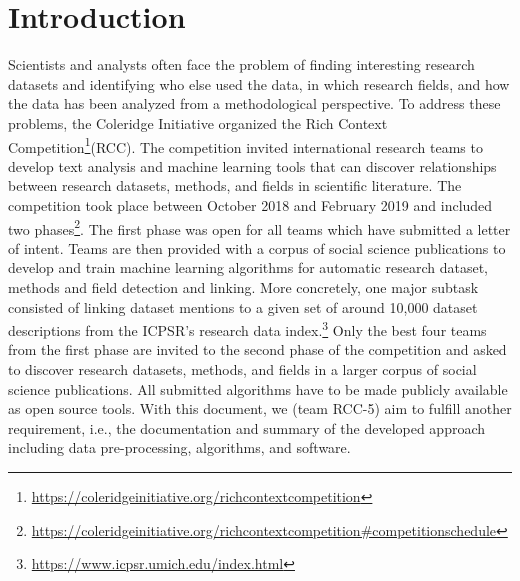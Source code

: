 \section{Introduction}
Scientists and analysts often face the problem of finding interesting research datasets and identifying who else used the data, in which research fields, and how the data has been analyzed from a methodological perspective.
To address these problems, the Coleridge Initiative organized the Rich Context Competition\footnote{\url{https://coleridgeinitiative.org/richcontextcompetition}}(RCC).
The competition invited international research teams to develop text analysis and machine learning tools that can discover relationships between research datasets, methods, and fields in scientific literature.
The competition took place between October 2018 and February 2019 and included two phases\footnote{\url{https://coleridgeinitiative.org/richcontextcompetition\#competitionschedule}}. The first phase was open for all teams which have submitted a letter of intent.
Teams are then provided with a corpus of social science publications to develop and train machine learning algorithms for automatic research dataset, methods and field detection and linking. 
More concretely, one major subtask consisted of linking dataset mentions to a given set of around 10,000 dataset descriptions from the ICPSR’s research data index.\footnote{\url{https://www.icpsr.umich.edu/index.html}}
Only the best four teams from the first phase are invited to the second phase of the competition and asked to discover research datasets, methods, and fields in a larger corpus of social science publications. All submitted algorithms have to be made publicly available as open source tools. With this document, we (team RCC-5) aim to fulfill another requirement, i.e., the documentation and summary of the developed approach including data pre-processing, algorithms, and software. 


